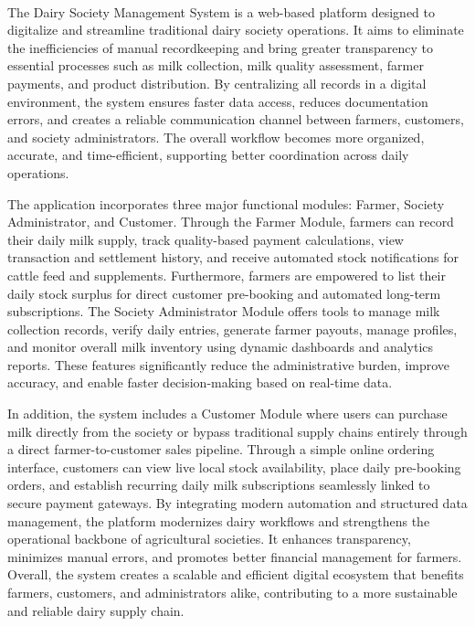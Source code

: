 \documentclass[12pt,a4paper]{report}
\begin{document}
\vspace{1cm}
\textcolor{red}{}\\
The Dairy Society Management System is a web-based platform designed to digitalize and streamline traditional dairy society operations. It aims to eliminate the inefficiencies of manual recordkeeping and bring greater transparency to essential processes such as milk collection, milk quality assessment, farmer payments, and product distribution. By centralizing all records in a digital environment, the system ensures faster data access, reduces documentation errors, and creates a reliable communication channel between farmers, customers, and society administrators. The overall workflow becomes more organized, accurate, and time-efficient, supporting better coordination across daily operations.

The application incorporates three major functional modules: Farmer, Society Administrator, and Customer. Through the Farmer Module, farmers can record their daily milk supply, track quality-based payment calculations, view transaction and settlement history, and receive automated stock notifications for cattle feed and supplements. Furthermore, farmers are empowered to list their daily stock surplus for direct customer pre-booking and automated long-term subscriptions. The Society Administrator Module offers tools to manage milk collection records, verify daily entries, generate farmer payouts, manage profiles, and monitor overall milk inventory using dynamic dashboards and analytics reports. These features significantly reduce the administrative burden, improve accuracy, and enable faster decision-making based on real-time data.

In addition, the system includes a Customer Module where users can purchase milk directly from the society or bypass traditional supply chains entirely through a direct farmer-to-customer sales pipeline. Through a simple online ordering interface, customers can view live local stock availability, place daily pre-booking orders, and establish recurring daily milk subscriptions seamlessly linked to secure payment gateways. By integrating modern automation and structured data management, the platform modernizes dairy workflows and strengthens the operational backbone of agricultural societies. It enhances transparency, minimizes manual errors, and promotes better financial management for farmers. Overall, the system creates a scalable and efficient digital ecosystem that benefits farmers, customers, and administrators alike, contributing to a more sustainable and reliable dairy supply chain.  
\end{document}
